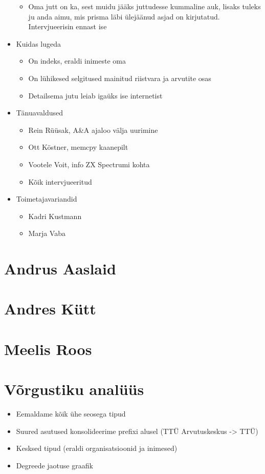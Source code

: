 \documentclass{tufte-book}
\begin{document}
\begin{itemize}
\begin{itemize}
		\item Oma jutt on ka, sest muidu jääks juttudesse kummaline auk, lisaks tuleks ju anda aimu, mis prisma läbi ülejäänud asjad on kirjutatud. Intervjueerisin ennast ise
	\end{itemize}
	\item Kuidas lugeda
	\begin{itemize}
		\item On indeks, eraldi inimeste oma
		\item On lühikesed selgitused mainitud riistvara ja arvutite osas
		\item Detailsema jutu leiab igaüks ise internetist
	\end{itemize}
	\item Tänuavaldused
	\begin{itemize}
		\item Rein Rüüsak, A\&A ajaloo välja uurimine
		\item Ott Köstner, memcpy kaanepilt
		\item Vootele Voit, info ZX Spectrumi kohta
		\item Kõik intervjueeritud
	\end{itemize}
	\item Toimetajavariandid
	\begin{itemize}
		\item Kadri Kustmann
		\item Marja Vaba
	\end{itemize}
 \end{itemize}

\mainmatter


\chapter{Andrus Aaslaid}


\chapter{Andres Kütt}


\chapter{Meelis Roos}



\chapter{Võrgustiku analüüs}
\begin{itemize}
	\item Eemaldame kõik ühe seosega tipud
	\item Suured asutused konsolideerime prefixi alusel (TTÜ Arvutuskeskus -> TTÜ)
	\item Kesksed tipud (eraldi organisatsioonid ja inimesed)
	\item Degreede jaotuse graafik
\end{itemize}
\end{document}
